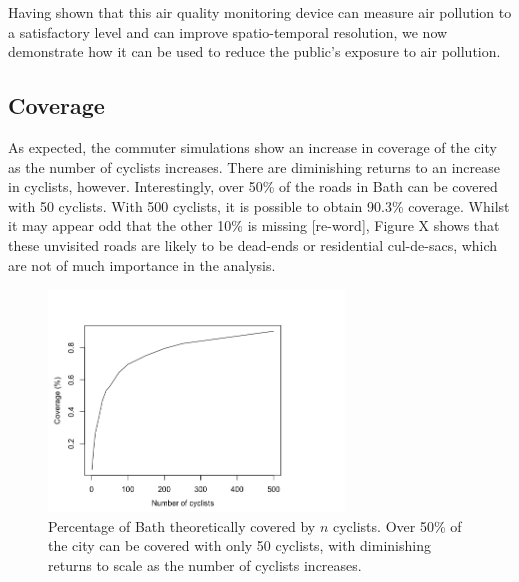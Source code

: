 \documentclass[11pt]{report}
\begin{document}
Having shown that this air quality monitoring device can measure air pollution to a satisfactory level and can improve spatio-temporal resolution, we now demonstrate how it can be used to reduce the public's exposure to air pollution.

\subsection{Coverage}

As expected, the commuter simulations show an increase in coverage of the city as the number of cyclists increases. There are diminishing returns to an increase in cyclists, however. Interestingly, over 50\% of the roads in Bath can be covered with 50 cyclists. With 500 cyclists, it is possible to obtain 90.3\% coverage. Whilst it may appear odd that the other 10\% is missing [re-word], Figure X shows that these unvisited roads are likely to be dead-ends or residential cul-de-sacs, which are not of much importance in the analysis.


\begin{figure}[!tb]
\centering
\includegraphics[width=0.7\textwidth]{images/coverage}
\caption{Percentage of Bath theoretically covered by $n$ cyclists. Over 50\% of the city can be covered with only 50 cyclists, with diminishing returns to scale as the number of cyclists increases.}
\label{fig:coverage}
\end{figure}

\end{document}
